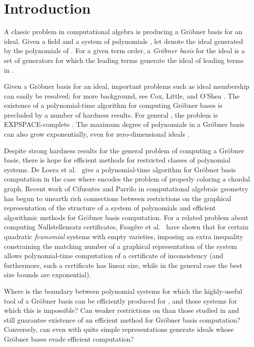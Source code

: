 \documentclass{article}
\begin{document}
\section{Introduction}
A classic problem in computational algebra is producing a Gr\"{o}bner basis for an ideal. Given a field  and a system of polynomials , let  denote the ideal generated by the polynomials of . For a given term order, a \emph{Gr\"{o}bner basis} for the ideal  is a set of generators for which the leading terms generate the ideal of leading terms in .

Given a Gr\"{o}bner basis for an ideal, important problems such as ideal membership can easily be resolved; for more background, see Cox, Little, and O'Shea \cite{cox}.
The existence of a polynomial-time algorithm for computing Gr\"{o}bner bases is precluded by a number of hardness results. For general , the problem is EXPSPACE-complete \cite{kuehnle, mayr:survey}. The maximum degree of polynomials in a Gr\"{o}bner basis can also grow exponentially, even for zero-dimensional ideals \cite{giusti,mayr,moller,ritscher}.

Despite strong hardness results for the general problem of computing a Gr\"{o}bner basis, there is hope for efficient methods for restricted classes of polynomial systems. De Loera et al.~\cite{deloera} give a polynomial-time algorithm for Gr\"{o}bner basis computation in the case where  encodes the problem of properly coloring a chordal graph. Recent work of Cifuentes and Parrilo \cite{parrilo} in computational algebraic geometry has begun to unearth rich connections between restrictions on the graphical representation of the structure of a system of polynomials and efficient algorithmic methods for Gr\"{o}bner basis computation. For a related problem about computing Nullstellensatz certificates, Faug\^ere et al.~\cite{Faugere} have shown that for certain quadratic \textit{fewnomial} systems with empty varieties, imposing an extra inequality constraining the matching number of a graphical representation of the system allows polynomial-time computation of a certificate of inconsistency (and furthermore, such a certificate has linear size, while in the general case the best size bounds are exponential).

Where is the boundary between polynomial systems for which the highly-useful tool of a Gr\"{o}bner basis can be efficiently produced for , and those systems for which this is impossible? Can weaker restrictions on  than those studied in \cite{parrilo} and \cite{deloera} still guarantee existence of an efficient method for Gr\"{o}bner basis computation? Conversely, can even  with quite simple representations generate ideals whose Gr\"{o}bner bases  evade efficient computation?
\end{document}
